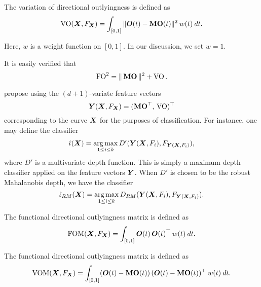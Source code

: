 \begin{definition}
    The variation of directional outlyingness is defined as
    \begin{equation}
        \operatorname{VO}(\bm{X}, F_{\bm{X}}) = \int_{[0, 1]} \Vert \bm{O}(t) - \operatorname{\textbf{MO}}(t) \Vert^2 \:w(t)\:dt.
    \end{equation}
\end{definition}

Here, $w$ is a weight function on $[0, 1]$.
In our discussion, we set $w = 1$.

It is easily verified that
\begin{equation}
    \operatorname{FO}^2 = \Vert \operatorname{\textbf{MO}} \Vert^2 + \operatorname{VO}.
\end{equation}

\textcite{dai-genton-2018} propose using the $(d + 1)$-variate feature vectors
\begin{equation}
    \bm{Y}(\bm{X}, F_{\bm{X}}) = (\operatorname{\textbf{MO}}^\top,\, \operatorname{VO})^\top
\end{equation}
corresponding to the curve $\bm{X}$ for the purposes of classification.
For instance, one may define the classifier
\begin{equation}
    \hat{\iota}(\bm{X}) = \operatorname*{arg\,max}_{1 \leq i \leq k} D'(\bm{Y}(\bm{X}, F_i), F_{\bm{Y}(\bm{X}, F_i)}),
\end{equation}
where $D'$ is a multivariate depth function.
This is simply a maximum depth classifier applied on the feature vectors
$\bm{Y}$.
When $D'$ is chosen to be the robust Mahalanobis depth, we have the classifier
\begin{equation}
    \hat{\iota}_{RM}(\bm{X}) = \operatorname*{arg\,max}_{1 \leq i \leq k} D_{RM}(\bm{Y}(\bm{X}, F_i), F_{\bm{Y}(\bm{X}, F_i)}).
\end{equation}


\begin{definition}
    The functional directional outlyingness matrix is defined as
    \begin{equation}
        \operatorname{FOM}(\bm{X}, F_{\bm{X}}) = \int_{[0, 1]} \bm{O}(t)\,\bm{O}(t)^\top \:w(t)\:dt.
    \end{equation}
\end{definition}

\begin{definition}
    The functional directional outlyingness matrix is defined as
    \begin{equation}
        \operatorname{VOM}(\bm{X}, F_{\bm{X}}) = \int_{[0, 1]} (\bm{O}(t) - \operatorname{\textbf{MO}}(t))\,(\bm{O}(t) - \operatorname{\textbf{MO}}(t))^\top \:w(t)\:dt.
    \end{equation}
\end{definition}

